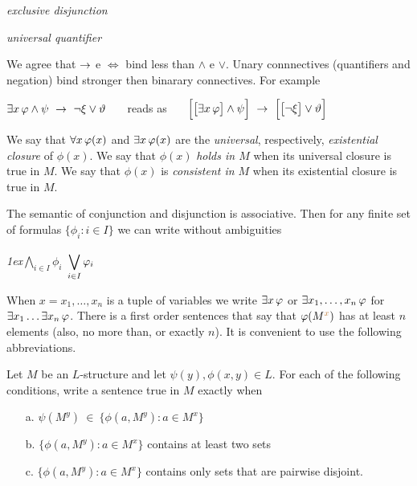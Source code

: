 \emph{exclusive disjunction}

\emph{universal quantifier}\bigskip

We agree that $\imp$ e $\iff$ bind less than $\wedge$ e $\vee$.
Unary connnectives (quantifiers and negation) bind stronger then binarary connectives. For example

\hfil$\E x\,\phi \wedge \psi\ \imp\ \neg\xi\vee\theta$ \ \ \ reads as \ \ \ $\Big[\big[\E x\,\phi\big]\wedge\psi\Big]\ \imp\ \Big[\big[\neg\xi\big]\vee\theta\Big]$

We say that $\A x\,\phi(x)$ and $\E x\,\phi(x)$ are the \emph{universal}, respectively, \emph{existential closure} of $\phi(x)$. We say that $\phi(x)$ \emph{holds in $M$\/} when its universal closure is true in $M$. We say that $\phi(x)$ is \emph{consistent in $M$\/} when its existential closure is true in $M$.

The semantic of conjunction and disjunction is associative. Then for any finite set of formulas $\{\phi_i:i\in I\}$ we can write without ambiguities 

\hfil \emph{\kern1ex$\displaystyle\bigwedge_{i\in I}^{\,}\phi_i$}\hfil \emph{$\displaystyle\kern1ex\bigvee_{i\in I}^{\,}\phi_i$}\bigskip

When $x=x_1,\dots,x_n$ is a tuple of variables we write \emph{$\E x\,\phi$\/} or \emph{$\E x_1,\dots,x_n\,\phi$\/} for $\E x_1\dots\E x_n\,\phi$.
There is a first order sentences that say that $\phi(M^{\mr x})$ has at least $n$ elements (also, no more than, or exactly $n$). It is convenient to use the following abbreviations.


\bigskip

\smallskip


\begin{exercise}\label{ex_fam_insiemi}
Let $M$ be an $L$-structure and let $\psi(y), \phi(x,y)\in L$. For each of the following conditions, write a sentence true in $M$ exactly when
\begin{itemize}
\item[a.] $\psi(M^y)\ \in\ \big\{\phi(a,M^y): a\in M^x\big\}$
\item[b.] $\big\{\phi(a,M^y): a\in M^x\big\}$ contains at least two sets
\item[c.] $\big\{\phi(a,M^y): a\in M^x\big\}$ contains only sets that are pairwise disjoint.
\end{itemize}
\end{exercise}

